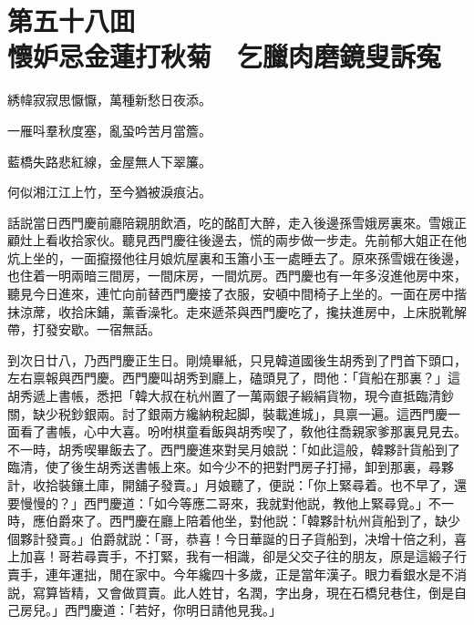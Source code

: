 
\chapter*{第五十八囬　\\懷妒忌金蓮打秋菊　乞臘肉磨鏡叟訴寃}


\begin{myquote}
綉幃寂寂思懨懨，萬種新愁日夜添。

一雁呌羣秋度塞，亂蛩吟苦月當簷。

藍橋失路悲紅線，金屋無人下翠簾。

何似湘江江上竹，至今猶被淚痕沾。
\end{myquote}

話説當日西門慶前廳陪親朋飲酒，吃的酩酊大醉，走入後邊孫雪娥房裏來。雪娥正顧灶上看收拾家伙。聽見西門慶往後邊去，慌的兩步做一步走。先前郁大姐正在他炕上坐的，一面攛掇他往月娘炕屋裏和玉簫小玉一處睡去了。原來孫雪娥在後邊，也住着一明兩暗三間房，一間床房，一間炕房。西門慶也有一年多沒進他房中來，聽見今日進來，連忙向前替西門慶接了衣服，安頓中間椅子上坐的。一面在房中揩抹涼蓆，收拾床鋪，薰香澡牝。走來遞茶與西門慶吃了，攙扶進房中，上床脱靴解帶，打發安歇。一宿無話。

到次日廿八，乃西門慶正生日。剛燒畢紙，只見韓道國後生胡秀到了門首下頭口，左右禀報與西門慶。西門慶叫胡秀到廳上，磕頭見了，問他：「貨船在那裏？」這胡秀遞上書帳，悉把「韓大叔在杭州置了一萬兩銀子緞絹貨物，現今直抵臨清鈔關，缺少税鈔銀兩。討了銀兩方纔納稅起脚，裝載進城」，具禀一遍。這西門慶一面看了書帳，心中大喜。吩咐棋童看飯與胡秀喫了，敎他往喬親家爹那裏見見去。不一時，胡秀喫畢飯去了。西門慶進來對吴月娘説：「如此這般，韓夥計貨船到了臨清，使了後生胡秀送書帳上來。如今少不的把對門房子打掃，卸到那裏，尋夥計，收拾裝鑲土庫，開舖子發賣。」月娘聽了，便説：「你上緊尋着。也不早了，還要慢慢的？」西門慶道：「如今等應二哥來，我就對他説，教他上緊尋覓。」不一時，應伯爵來了。西門慶在廳上陪着他坐，對他説：「韓夥計杭州貨船到了，缺少個夥計發賣。」伯爵就説：「哥，恭喜！今日華誕的日子貨船到，决增十倍之利，喜上加喜！哥若尋賣手，不打緊，我有一相識，卻是父交子往的朋友，原是這緞子行賣手，連年運拙，閒在家中。今年纔四十多歲，正是當年漢子。眼力看銀水是不消説，寫算皆精，又會做買賣。此人姓甘，名潤，字出身，現在石橋兒巷住，倒是自己房兒。」西門慶道：「若好，你明日請他見我。」

